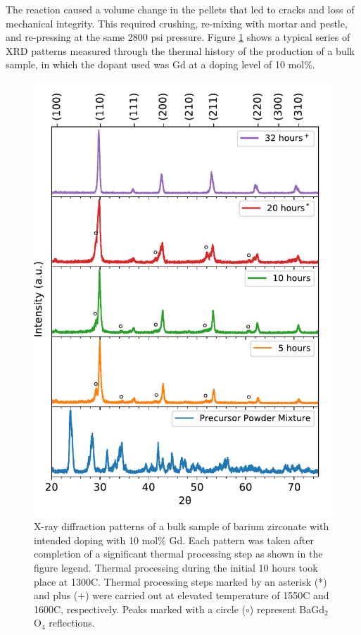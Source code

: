 The reaction caused a volume change in the pellets that led to cracks and loss of mechanical integrity. This required crushing, re-mixing with mortar and pestle, and re-pressing at the same 2800 psi pressure. Figure \ref{fig:target:xrd:reaction:bzgxs10} shows a typical series of XRD patterns measured through the thermal history of the production of a bulk sample, in which the dopant used was Gd at a doping level of 10 mol\%.  
\begin{figure}
    \centering
    \includegraphics{Figures/170629-xrd-BZGxs10-reaction-monitor-2-edit-3.pdf}
    \caption{X-ray diffraction patterns of a bulk sample of barium zirconate with intended doping with 10 mol\% Gd. Each pattern was taken after completion of a significant thermal processing step as shown in the figure legend. Thermal processing during the initial 10 hours took place at 1300\textdegree C. Thermal processing steps marked by an asterisk (*) and plus (+) were carried out at elevated temperature of 1550\textdegree C and 1600\textdegree C, respectively. Peaks marked with a circle ($\circ$) represent BaGd$_2$O$_4$ reflections.}
    \label{fig:target:xrd:reaction:bzgxs10}
\end{figure}

